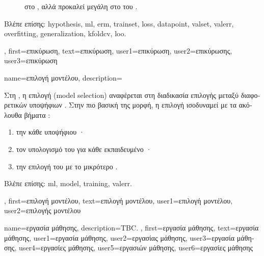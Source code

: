 {{\begin{figure}[H]
{{			\foreignlanguage{greek}{στο} , \foreignlanguage{greek}{αλλά προκαλεί μεγάλη}  
			\foreignlanguage{greek}{στο}  \foreignlanguage{greek}{του} . \label{fig_validation_dict}} }
		\end{figure} 
		\foreignlanguage{greek}{Βλέπε επίσης:} \gls{hypothesis}, \gls{ml}, \gls{erm}, \gls{trainset}, \gls{loss}, \gls{datapoint}, \gls{valset}, 
		\gls{valerr}, \gls{overfitting}, \gls{generalization}, \gls{kfoldcv}, \gls{loo}.},
	first={\foreignlanguage{greek}{επικύρωση}},
	text={\foreignlanguage{greek}{επικύρωση}},
	user1={\foreignlanguage{greek}{επικύρωση}}, %
	user2={\foreignlanguage{greek}{επικύρωσης}}, %
	user3={\foreignlanguage{greek}{επικύρωση}} %
}

{name={\foreignlanguage{greek}{επιλογή μοντέλου}},
	description={\foreignlanguage{greek}{Στη} , 
		\foreignlanguage{greek}{η επιλογή}  (model selection) \foreignlanguage{greek}{αναφέρεται στη 
		διαδικασία επιλογής μεταξύ διαφορετικών υποψήφιων} . \foreignlanguage{greek}{Στην πιο βασική 
		της μορφή, η επιλογή}  \foreignlanguage{greek}{ισοδυναμεί με τα ακόλουθα βήματα} 
		\cite[\foreignlanguage{greek}{Κεφ.} 6]{MLBasics}: 
		\begin{enumerate}[label=\arabic*)]
			\item \foreignlanguage{greek}{την}  \foreignlanguage{greek}{κάθε υποψήφιου} · 
			\item \foreignlanguage{greek}{τον υπολογισμό του}  \foreignlanguage{greek}{για κάθε εκπαιδευμένο} 
				· 
			\item \foreignlanguage{greek}{την επιλογή του}  \foreignlanguage{greek}{με το μικρότερο} 
				.
		\end{enumerate}
		\foreignlanguage{greek}{Βλέπε επίσης:} \gls{ml}, \gls{model}, \gls{training}, \gls{valerr}. },
	first={\foreignlanguage{greek}{επιλογή μοντέλου}},
	text={\foreignlanguage{greek}{επιλογή μοντέλου}},
	user1={\foreignlanguage{greek}{επιλογή μοντέλου}}, %
	user2={\foreignlanguage{greek}{επιλογής μοντέλου}} %
}

{name={\foreignlanguage{greek}{εργασία μάθησης}},
	description={TBC. },
	first={\foreignlanguage{greek}{εργασία μάθησης}},
	text={\foreignlanguage{greek}{εργασία μάθησης}},
	user1={\foreignlanguage{greek}{εργασία μάθησης}}, %
	user2={\foreignlanguage{greek}{εργασίας μάθησης}}, %
	user3={\foreignlanguage{greek}{εργασία μάθησης}}, %
	user4={\foreignlanguage{greek}{εργασίες μάθησης}}, %
	user5={\foreignlanguage{greek}{εργασιών μάθησης}}, %
	user6={\foreignlanguage{greek}{εργασίες μάθησης}} %
}

